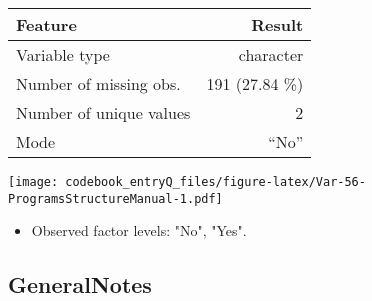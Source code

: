 \documentclass[]{article}
\providecommand{\tightlist}{%
  \setlength{\itemsep}{0pt}\setlength{\parskip}{0pt}}
\newcommand{\fullline}{\noindent\makebox[\linewidth]{\rule{\textwidth}{0.4pt}}}
\newcommand{\bminione}{\begin{minipage}{0.75 \textwidth}}
\newcommand{\bminitwo}{\begin{minipage}{0.25 \textwidth}}
\newcommand{\emini}{\end{minipage}}
\begin{document}
\bminione

\begin{longtable}[]{@{}lr@{}}
\toprule
\begin{minipage}[b]{0.34\columnwidth}\raggedright\strut
Feature\strut
\end{minipage} & \begin{minipage}[b]{0.20\columnwidth}\raggedleft\strut
Result\strut
\end{minipage}\tabularnewline
\midrule
\endhead
\begin{minipage}[t]{0.34\columnwidth}\raggedright\strut
Variable type\strut
\end{minipage} & \begin{minipage}[t]{0.20\columnwidth}\raggedleft\strut
character\strut
\end{minipage}\tabularnewline
\begin{minipage}[t]{0.34\columnwidth}\raggedright\strut
Number of missing obs.\strut
\end{minipage} & \begin{minipage}[t]{0.20\columnwidth}\raggedleft\strut
191 (27.84 \%)\strut
\end{minipage}\tabularnewline
\begin{minipage}[t]{0.34\columnwidth}\raggedright\strut
Number of unique values\strut
\end{minipage} & \begin{minipage}[t]{0.20\columnwidth}\raggedleft\strut
2\strut
\end{minipage}\tabularnewline
\begin{minipage}[t]{0.34\columnwidth}\raggedright\strut
Mode\strut
\end{minipage} & \begin{minipage}[t]{0.20\columnwidth}\raggedleft\strut
``No''\strut
\end{minipage}\tabularnewline
\bottomrule
\end{longtable}

\emini
\bminitwo
\texttt{[image: codebook\_entryQ\_files/figure-latex/Var-56-ProgramsStructureManual-1.pdf]}
\emini

\begin{itemize}
\tightlist
\item
  Observed factor levels: "No", "Yes".
\end{itemize}

\fullline

\hypertarget{generalnotes}{\subsection{GeneralNotes}\label{generalnotes}}
\end{document}
